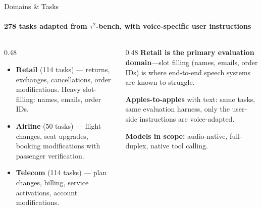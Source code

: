 \documentclass[aspectratio=169]{beamer}
\newcommand{\tautwobench}{$\tau^2$-bench}
\begin{document}
\begin{frame}{Domains \& Tasks}
  \framesubtitle{278 tasks adapted from \tautwobench{}, with voice-specific user instructions}

  \begin{columns}[T]
    \begin{column}{0.48\textwidth}
      \begin{itemize}
        \item \textbf{Retail} (114 tasks) --- returns, exchanges, cancellations, order modifications. Heavy slot-filling: names, emails, order IDs.
        \item \textbf{Airline} (50 tasks) --- flight changes, seat upgrades, booking modifications with passenger verification.
        \item \textbf{Telecom} (114 tasks) --- plan changes, billing, service activations, account modifications.
      \end{itemize}
    \end{column}
    \begin{column}{0.48\textwidth}
      \textbf{Retail is the primary evaluation domain}---slot filling (names, emails, order IDs) is where end-to-end speech systems are known to struggle.

      \vspace{0.8em}
      \textbf{Apples-to-apples} with text: same tasks, same evaluation harness, only the user-side instructions are voice-adapted.

      \vspace{0.8em}
      \textbf{Models in scope:} audio-native, full-duplex, native tool calling.
    \end{column}
  \end{columns}

\end{frame}

\end{document}
